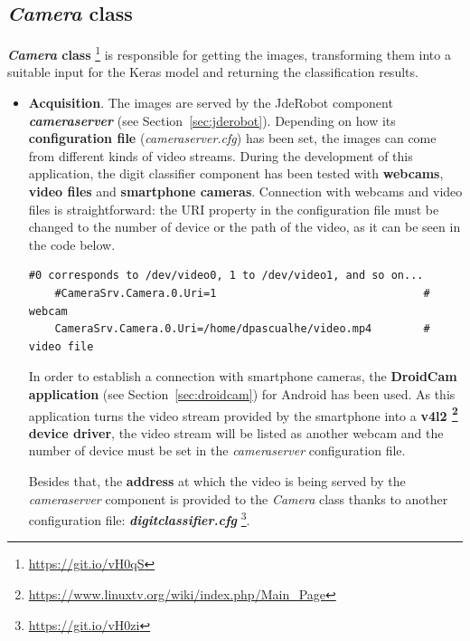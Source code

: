 \subsection{\textit{Camera} class}
\textbf{\textit{Camera} class} \footnote{\url{https://git.io/vH0qS}} is responsible for getting the images, transforming them into a suitable input for the Keras model and returning the classification results.

\begin{itemize}
	\item \textbf{Acquisition}. The images are served by the JdeRobot component \textbf{\textit{cameraserver}} (see Section~\ref{sec:jderobot}). Depending on how its \textbf{configuration file} (\textit{cameraserver.cfg}) has been set, the images can come from different kinds of video streams. During the development of this application, the digit classifier component has been tested with \textbf{webcams}, \textbf{video files} and \textbf{smartphone cameras}. Connection with webcams and video files is straightforward: the URI property in the configuration file must be changed to the number of device or the path of the video, as it can be seen in the code below.
	\begin{lstlisting}[frame=single]
	#0 corresponds to /dev/video0, 1 to /dev/video1, and so on...
	#CameraSrv.Camera.0.Uri=1                                # webcam
	CameraSrv.Camera.0.Uri=/home/dpascualhe/video.mp4        # video file
	\end{lstlisting}
	
	In order to establish a connection with smartphone cameras, the \textbf{DroidCam application} (see Section~\ref{sec:droidcam}) for Android has been used. As this application turns the video stream provided by the smartphone into a \textbf{v4l2 \footnote{\url{https://www.linuxtv.org/wiki/index.php/Main_Page}} device driver}, the video stream will be listed as another webcam and the number of device must be set in the \textit{cameraserver} configuration file.
	
	Besides that, the \textbf{address} at which the video is being served by the \textit{cameraserver} component is provided to the \textit{Camera} class thanks to another configuration file: \textbf{\textit{digitclassifier.cfg}} \footnote{\url{https://git.io/vH0zi}}.
	

\end{itemize}
